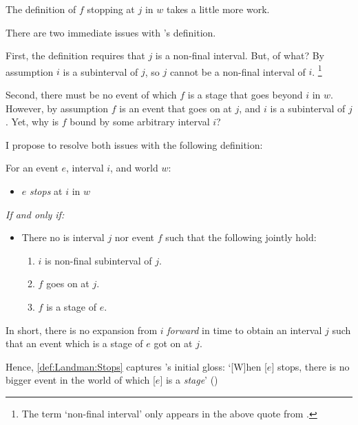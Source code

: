 \begin{note}
  The definition of \(f\) stopping at \(j\) in \(w\) takes a little more work.

  There are two immediate issues with \citeauthor{Landman:1992wh}'s definition.

  First, the definition requires that \(j\) is a non-final interval.
  But, of what?
  By assumption \(i\) is a subinterval of \(j\), so \(j\) cannot be a non-final interval of \(i\).%
  \footnote{
    The term `non-final interval' only appears in the above quote from \citeauthor{Landman:1992wh}.
  }

  Second, there must be no event of which \(f\) is a stage that goes beyond \(i\) in \(w\).
  However, by assumption \(f\) is an event that goes on at \(j\), and \(i\) is a subinterval of \(j\).
  Yet, why is \(f\) bound by some arbitrary interval \(i\)?

  I propose to resolve both issues with the following definition:
  \begin{definition}[Stops]
    \label{def:Landman:Stops}
    For an event \(e\), interval \(i\), and world \(w\):
    \begin{itemize}
    \item
      \(e\) \emph{stops} at \(i\) in \(w\)
    \end{itemize}
    \emph{If and only if:}
    \begin{itemize}
    \item
      There no is interval \(j\) nor event \(f\) such that the following jointly hold:
      \begin{enumerate}[label=\alph*., noitemsep]
      \item
        \(i\) is non-final subinterval of \(j\).
      \item
        \(f\) goes on at \(j\).
      \item
        \(f\) is a stage of \(e\).
      \end{enumerate}
    \end{itemize}
    \vspace{-\baselineskip}
  \end{definition}
  In short, there is no expansion from \(i\) \emph{forward} in time to obtain an interval \(j\) such that an event which is a stage of \(e\) got on at \(j\).

  Hence, \autoref{def:Landman:Stops} captures \citeauthor{Landman:1992wh}'s initial gloss: `[W]hen [\(e\)] stops, there is no bigger event in the world of which [\(e\)] is a \emph{stage}' (\citeyear[23]{Landman:1992wh})
\end{note}

